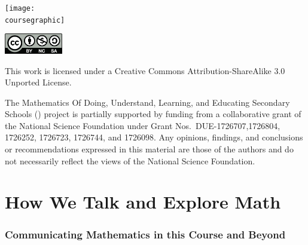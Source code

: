 \documentclass[11pt]{article}
\theoremstyle{definition}
\begin{document}
\maketitle
\ifthenelse{\equal{\coursegraphic}{}} %
	{}
	{\begin{center}\texttt{[image: \\coursegraphic]}\end{center}}
	
\vfill 
\begin{center} \includegraphics[width=1in]{by-nc-sa.png} \end{center}
\footnotesize{ This work is licensed under a Creative Commons Attribution-ShareAlike 3.0 Unported License. }

\footnotesize{
The Mathematics Of Doing, Understand, Learning, and Educating Secondary Schools (\MODULES) project is partially supported by funding from a collaborative grant of the National Science Foundation under Grant Nos.~DUE-1726707,1726804, 1726252, 1726723, 1726744, and 1726098.  Any opinions, findings, and conclusions or recommendations expressed in this material are those of the authors and do not necessarily reflect the views of the National Science Foundation.}
\newpage
\thispagestyle{plain}   
\listoftodos
\tableofcontents
\newpage {}



\newpage 
\part{How We Talk and Explore Math} 

\setcounter{section}{-1}

\newpage \section{Communicating Mathematics in this Course and Beyond}\label{section: communicating mathematics}
\end{document}
